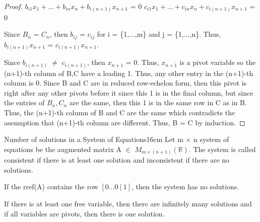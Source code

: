 \begin{proof}
        \hspace{0.5cm}
        $b_{i1}x_1 + ... + b_{in}x_n + b_{i(n+1)}x_{n+1}$ = 0
        \hspace{1cm}
        $c_{i1}x_1 + ... + c_{in}x_n + c_{i(n+1)}x_{n+1}$ = 0

        Since $B_n$ = $C_n$, then $b_{ij}$ = $c_{ij}$ for i = \{1,...,m\}
        and j = \{1,...,n\}. Thus,
        $b_{i(n+1)}x_{n+1}$ = $c_{i(n+1)}x_{n+1}$.

        Since $b_{i(n+1)}$ $\not =$ $c_{i(n+1)}$,
        then $x_{n+1}$ = 0. Thus, $x_{n+1}$ is a pivot variable so the (n+1)-th
        column of B,C have a leading 1. Thus, any other entry in the (n+1)-th
        column is 0. Since B and C are in reduced row-echelon form, then this
        pivot is right after any other pivots before it since this 1 is in
        the final column, but since the entries of $B_n,C_n$ are the same,
        then this 1 is in the same row in C as in B. Thus, the (n+1)-th column
        of B and C are the same which contradicts the assumption that
        (n+1)-th column are different. Thus, B = C
        by induction.
    \end{proof}

    \vspace{0.5cm}



    \begin{wtheorem}{Number of solutions in a System of Equations}{16cm}
        Let m $\times$ n system of equations be the
        augmented matrix A $\in$ $M_{m \times (n+1)}(\mathbb{R})$.
        The system is called {\color{lblue} consistent} if there
        is at least one solution and {\color{lblue} inconsistent}
        if there are no solutions.

        \vspace{0.2cm}

        If the rref(A) contains the row $[0 ... 0 \ | \ 1]$, then
        the system has no solutions.

        If there is at least one free variable, then there are infinitely
        many solutions and if all variables are pivots,
        then there is one solution.
    \end{wtheorem}


